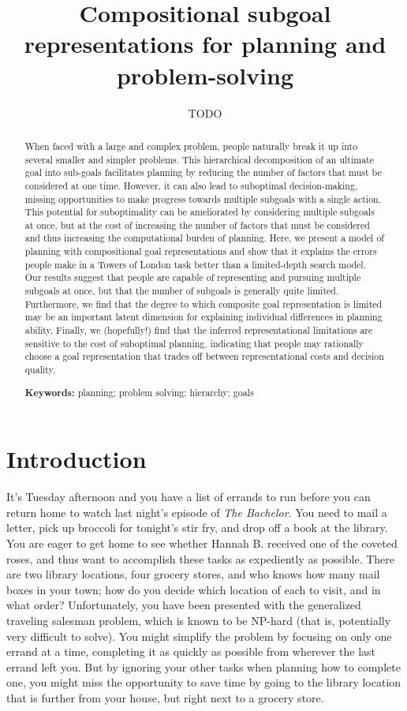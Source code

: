 \documentclass[10pt,letterpaper]{article}
\title{Compositional subgoal representations for planning and problem-solving}
\author{TODO}
\begin{document}
\maketitle


\begin{abstract}
When faced with a large and complex problem, people naturally break it up into several smaller and simpler problems. This hierarchical decomposition of an ultimate goal into sub-goals facilitates planning by reducing the number of factors that must be considered at one time. However, it can also lead to suboptimal decision-making, missing opportunities to make progress towards multiple subgoals with a single action. This potential for suboptimality can be ameliorated by considering multiple subgoals at once, but at the cost of increasing the number of factors that must be considered and thus increasing the computational burden of planning. Here, we present a model of planning with compositional goal representations and show that it explains the errors people make in a Towers of London task better than a limited-depth search model. Our results suggest that people are capable of representing and pursuing multiple subgoals at once, but that the number of subgoals is generally quite limited. Furthermore, we find that the degree to which composite goal representation is limited may be an important latent dimension for explaining individual differences in planning ability. Finally, we (hopefully!) find that the inferred representational limitations are sensitive to the cost of suboptimal planning, indicating that people may rationally choose a goal representation that trades off between representational costs and decision quality.

\textbf{Keywords:} 
planning; problem solving; hierarchy; goals
\end{abstract}


\section{Introduction}

It's Tuesday afternoon and you have a list of errands to run before you can return home to watch last night's episode of \textit{The Bachelor}. You need to mail a letter, pick up broccoli for tonight's stir fry, and drop off a book at the library. You are eager to get home to see whether Hannah B. received one of the coveted roses, and thus want to accomplish these tasks as expediently as possible. There are two library locations, four grocery stores, and who knows how many mail boxes in your town; how do you decide which location of each to visit, and in what order? Unfortunately, you have been presented with the generalized traveling salesman problem, which is known to be NP-hard (that is, potentially very difficult to solve). You might simplify the problem by focusing on only one errand at a time, completing it as quickly as possible from wherever the last errand left you. But by ignoring your other tasks when planning how to complete one, you might miss the opportunity to save time by going to the library location that is further from your house, but right next to a grocery store.
\end{document}
